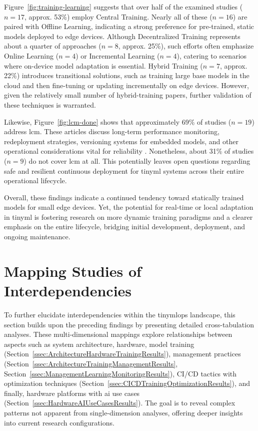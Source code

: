 Figure~\ref{fig:training-learning} suggests that over half of the examined studies ($n=17$, approx. 53\%) employ Central Training. Nearly all of these ($n=16$) are paired with Offline Learning, indicating a strong preference for pre-trained, static models deployed to edge devices. Although Decentralized Training represents about a quarter of approaches ($n=8$, approx. 25\%), such efforts often emphasize Online Learning ($n=4$) or Incremental Learning ($n=4$), catering to scenarios where on-device model adaptation is essential. Hybrid Training ($n=7$, approx. 22\%) introduces transitional solutions, such as training large base models in the cloud and then fine-tuning or updating incrementally on edge devices. However, given the relatively small number of hybrid-training papers, further validation of these techniques is warranted.

Likewise, Figure~\ref{fig:lcm-done} shows that approximately 69\% of studies ($n=19$) address \gls{lcm}. These articles discuss long-term performance monitoring, redeployment strategies, versioning systems for embedded models, and other operational considerations vital for reliability \cite{huangRIOTMLToolkitOvertheair2024a, sudharsanOTATinyMLAirDeployment2022}. Nonetheless, about 31\% of studies ($n=9$) do not cover \gls{lcm} at all. This potentially leaves open questions regarding safe and resilient continuous deployment for \gls{tinyml} systems across their entire operational lifecycle.

Overall, these findings indicate a continued tendency toward statically trained models for small edge devices. Yet, the potential for real-time or local adaptation in \gls{tinyml} is fostering research on more dynamic training paradigms and a clearer emphasis on the entire lifecycle, bridging initial development, deployment, and ongoing maintenance.

\section{Mapping Studies of Interdependencies}
\label{sec:MappingStudiesResults}

To further elucidate interdependencies within the \gls{tinymlops} landscape, this section builds upon the preceding findings by presenting detailed cross-tabulation analyses. These multi-dimensional mappings explore relationships between aspects such as system architecture, hardware, model training (Section~\ref{ssec:ArchitectureHardwareTrainingResults}), management practices (Section~\ref{ssec:ArchitectureTrainingManagementResults}, Section~\ref{ssec:ManagementLearningMonitoringResults}), CI/CD tactics with optimization techniques (Section~\ref{ssec:CICDTrainingOptimizationResults}), and finally, hardware platforms with \gls{ai} use cases (Section~\ref{ssec:HardwareAIUseCasesResults}). The goal is to reveal complex patterns not apparent from single-dimension analyses, offering deeper insights into current research configurations.

